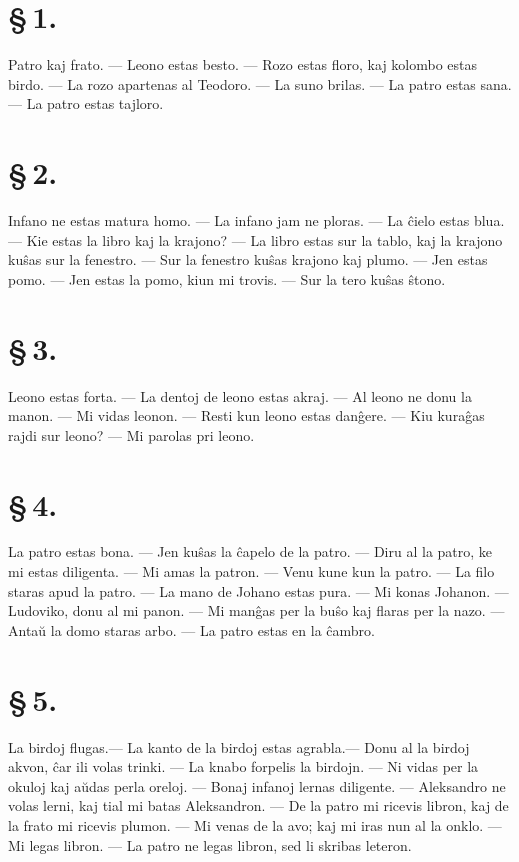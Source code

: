 \section*{\S\,1.}
Patro kaj frato. --- Leono estas besto. --- Rozo estas floro, kaj
kolombo estas birdo. --- La rozo apartenas al Teodoro. --- La suno
brilas. --- La patro estas sana. --- La patro estas tajloro.

\section*{\S\,2.}
Infano ne estas matura homo. --- La infano jam ne ploras. --- La
\^cielo estas blua. --- Kie estas la libro kaj la krajono? --- La
libro estas sur la tablo, kaj la krajono ku\^sas sur la fenestro.
--- Sur la fenestro ku\^sas krajono kaj plumo. --- Jen estas
pomo. --- Jen estas la pomo, kiun mi trovis. --- Sur la tero ku\^sas
\^stono.


\section*{\S\,3.}
Leono estas forta. --- La dentoj de leono estas akraj. --- Al leono
ne donu la manon. --- Mi vidas leonon. --- Resti kun leono estas
dan\^gere. --- Kiu kura\^gas rajdi sur leono? --- Mi parolas pri
leono.


\section*{\S\,4.}
La patro estas bona. --- Jen ku\^sas la \^capelo de la patro. ---
Diru al la patro, ke mi estas diligenta. --- Mi amas la patron. ---
Venu kune kun la patro. --- La filo staras apud la patro. --- La
mano de Johano estas pura. --- Mi konas Johanon. --- Ludoviko, donu
al mi panon. --- Mi man\^gas per la bu\^so kaj flaras per la nazo.
--- Anta\u u la domo staras arbo. --- La patro estas en la \^cambro.


\section*{\S\,5.}
La birdoj flugas.--- La kanto de la birdoj estas agrabla.--- Donu al
la birdoj akvon, \^car ili volas trinki. --- La knabo forpelis la
birdojn. --- Ni vidas per la okuloj kaj a\u udas perla oreloj.
--- Bonaj infanoj lernas diligente. --- Aleksandro ne volas lerni, kaj
tial mi batas Aleksandron. --- De la patro mi ricevis libron, kaj de
la frato mi ricevis plumon. --- Mi venas de la avo; kaj mi iras nun
al la onklo. --- Mi legas libron. --- La patro ne legas libron, sed
li skribas leteron.

